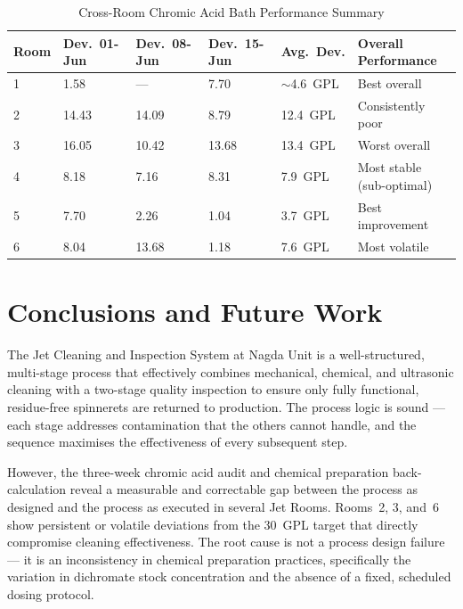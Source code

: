 \documentclass{book}
\begin{document}
\begin{table}[H]
  \centering
  \caption{Cross-Room Chromic Acid Bath Performance Summary}
  \label{tab:summary}
  \begin{tabular}{C{1.5cm} C{2cm} C{2cm} C{2cm} C{2cm} L{4cm}}
    \toprule
    \color{white}\textbf{Room} &
    \color{white}\textbf{Dev.\ 01-Jun} &
    \color{white}\textbf{Dev.\ 08-Jun} &
    \color{white}\textbf{Dev.\ 15-Jun} &
    \color{white}\textbf{Avg.\ Dev.} &
    \color{white}\textbf{Overall Performance} \\
     & 1.58  & ---   & 7.70  & $\sim$4.6~GPL  & Best overall \\
    2 & 14.43 & 14.09 & 8.79  & 12.4~GPL       & Consistently poor \\
    3 & 16.05 & 10.42 & 13.68 & 13.4~GPL       & Worst overall \\
    4 & 8.18  & 7.16  & 8.31  & 7.9~GPL        & Most stable (sub-optimal) \\
    5 & 7.70  & 2.26  & 1.04  & 3.7~GPL        & Best improvement \\
    6 & 8.04  & 13.68 & 1.18  & 7.6~GPL        & Most volatile \\
    \bottomrule
  \end{tabular}
\end{table}

\chapter{Conclusions and Future Work}

The Jet Cleaning and Inspection System at Nagda Unit is a well-structured, multi-stage process that effectively combines mechanical, chemical, and ultrasonic cleaning with a two-stage quality inspection to ensure only fully functional, residue-free spinnerets are returned to production. The process logic is sound --- each stage addresses contamination that the others cannot handle, and the sequence maximises the effectiveness of every subsequent step.

However, the three-week chromic acid audit and chemical preparation back-calculation reveal a measurable and correctable gap between the process as designed and the process as executed in several Jet Rooms. Rooms~2, 3, and~6 show persistent or volatile deviations from the 30~GPL target that directly compromise cleaning effectiveness. The root cause is not a process design failure --- it is an inconsistency in chemical preparation practices, specifically the variation in dichromate stock concentration and the absence of a fixed, scheduled dosing protocol.
\end{document}
